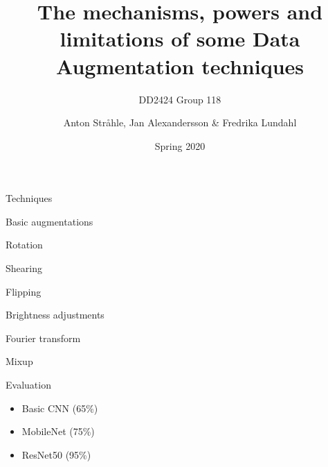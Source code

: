 \documentclass[a4paper,10pt]{beamer}
\title{The mechanisms, powers and limitations of some Data Augmentation techniques}
\subtitle{DD2424 Group 118}
\author{Anton Str\aa hle, Jan Alexandersson \& Fredrika Lundahl}
\date{Spring 2020}
\newcommand{\SubItem}[1]{
    {\setlength\itemindent{15pt} \item[\color{red}$\rhd$] #1}
}
\begin{document}
\begin{frame}

\titlepage

\end{frame}

\begin{frame}{Techniques}

\begin{itemize}
	\item Basic augmentations
	\SubItem{Rotation}
	\SubItem{Shearing}
	\SubItem{Flipping}
	\SubItem{Brightness adjustments}
	\item Fourier transform
	\item Mixup
\end{itemize}

\end{frame}

\begin{frame}{Evaluation}

\begin{itemize}
	\item Basic CNN (65\%)
	\item MobileNet (75\%)
	\item ResNet50 (95\%)
\end{itemize}

\end{frame}
\end{document}
